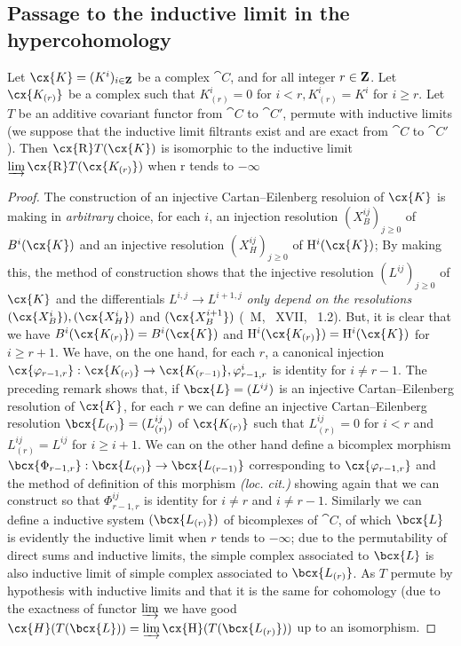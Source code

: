 \subsection{Passage to the inductive limit in the hypercohomology}
\label{subsection:0.11.5}
\begin{lemma}[11.5.1]
\label{0.11.5.1}
Let $\cx{K} = (K^i)_{i\in \bb{Z}}$ be a complex $\cat{C}$, and for all integer $r\in \mathbf{Z}$.
Let $\cx{K_{(r)}}$ be a complex such that $K_{(r)}^i = 0$ for $i<r, K_{(r)}^i = K^i$ for $i\geq r$.
Let $T$ be an additive covariant functor from $\cat{C}$ to $\cat{C'}$, permute with inductive limits 
(we suppose that the inductive limit filtrants exist and are exact from $\cat{C}$ to $\cat{C'}$).
Then $\cx{\RR}T(\cx{K})$ is isomorphic to the inductive limit $\varinjlim \cx{\RR} T(\cx{K_{(r)}})$ when r tends to $-\infty$
\end{lemma}
\begin{proof}
The construction of an injective Cartan--Eilenberg resoluion of $\cx{K}$ is making in \emph{arbitrary} choice, for each $i$, 
an injection resolution $(X_{B}^{ij})_{j\geq 0}$ of $B^i(\cx{K})$ and an injective resolution $(X_{H}^{ij})_{j\geq 0}$ of $\HH^i(\cx{K})$; 
By making this, the method of construction shows that the injective resolution $(L^{ij})_{j\geq 0}$ of $\cx{K}$ and 
the differentials $L^{i,j} \rightarrow L^{i+1, j}$ \emph{only depend on the resolutions} $(\cx{X_B^i}), (\cx{X_H^i})$ and $(\cx{X_B^{i+1}})$ (~M, ~XVII, ~1.2).
But, it is clear that we have $B^i(\cx{K_{(r)}}) = B^i(\cx{K})$ and $\HH^i(\cx{K_{(r)}}) = \HH^i(\cx{K})$ for $i\geq r+1$.
We have, on the one hand, for each $r$, a canonical injection $\cx{\varphi_{r-1, r}}: \cx{K_{(r)}} \rightarrow \cx{K_{(r-1)}}, \varphi_{r-1, r}^i$ is identity for $i\neq r-1$. 
The preceding remark shows that, if $\bcx{L} = (L^{ij})$ is an injective Cartan--Eilenberg resolution of $\cx{K}$,
for each $r$ we can define an injective Cartan--Eilenberg resolution $\bcx{L_{(r)}} = (L_{(r)}^{ij})$ of $\cx{K_{(r)}}$ such that $L_{(r)}^{ij} = 0$ for $i<r$ and $L_{(r)}^{ij} = L^{ij}$ for $i\geq i+1$.
We can on the other hand define a bicomplex morphism $\bcx{\Phi_{r-1, r}}: \bcx{L_{(r)}} \rightarrow \bcx{L_{(r-1)}}$ corresponding to $\cx{\varphi_{r-1, r}}$ and 
the method of definition of this morphism \emph{(loc. cit.)} showing again that we can construct so that $\Phi_{r-1, r}^{ij}$ is identity for $i\neq r$ and $i\neq r-1$.
Similarly we can define a inductive system $(\bcx{L_{(r)}})$ of bicomplexes of $\cat{C}$, 
of which $\bcx{L}$ is evidently the inductive limit when $r$ tends to $-\infty$; 
due to the permutability of direct sums and inductive limits, the simple complex associated to $\bcx{L}$ is also inductive limit of simple complex associated to $\bcx{L_{(r)}}$.
As $T$ permute by hypothesis with inductive limits and that it is the same for cohomology 
(due to the exactness of functor $\varinjlim$ we have good $\cx{H}(T(\bcx{L})) = \varinjlim\cx{\HH}(T(\bcx{L_{(r)}}))$ up to an isomorphism.
\end{proof}

